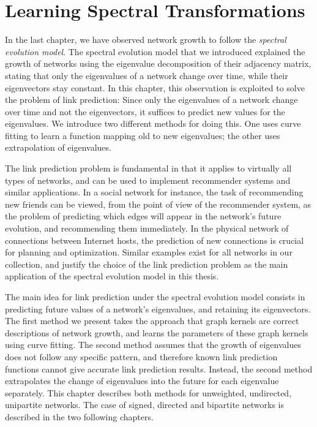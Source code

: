 \documentclass[11pt,a4paper]{book}
\begin{document}
\chapter{Learning Spectral Transformations}
\label{chap:learning}
In the last chapter, we have observed network growth to follow the
\emph{spectral evolution model}. 
The spectral evolution model that we introduced explained the growth of
networks using the eigenvalue decomposition of their adjacency matrix, 
stating that only the eigenvalues of a network change over time, while
their eigenvectors stay constant. 
In this chapter, this observation is exploited to solve the problem
of link prediction:  Since only the eigenvalues of a network change over
time and not the eigenvectors, it suffices to predict new values for the
eigenvalues. 
We introduce two different methods for doing this.  One uses curve
fitting to learn a function mapping old to new eigenvalues; the
other uses extrapolation of eigenvalues.  

The link prediction problem is fundamental in that it applies to
virtually all types of networks, and can be used to implement
recommender systems and similar applications.  In a social network for
instance, the task of recommending new friends can be viewed, from the
point of view of the recommender system, as the problem of predicting
which edges will appear in the network's future evolution, and
recommending them immediately.  In the physical network of connections
between Internet
hosts, the prediction of new connections is crucial for planning and
optimization.  Similar examples exist for all networks in our
collection, and justify the choice of the link prediction problem as the
main application of the spectral evolution model in this thesis. 

The main idea for link prediction under the spectral evolution model
consists in predicting future values of a network's eigenvalues, and
retaining its eigenvectors. 
The first method we present takes the approach that graph kernels are
correct descriptions of network growth, and learns the parameters of
these graph kernels using curve fitting.  
The second method assumes that the growth of eigenvalues does not follow
any specific pattern, and therefore known link prediction functions
cannot give accurate link 
prediction results.  Instead, the second method extrapolates the change
of eigenvalues into the future for each eigenvalue separately.  
This chapter describes both methods for unweighted, undirected, unipartite
networks.  The case of signed, directed and bipartite networks is
described in the two following chapters. 
\end{document}
